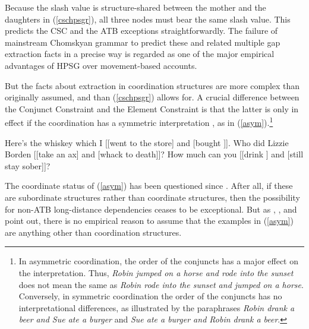 \documentclass[output=paper
                ,modfonts
                ,nonflat
	        ,collection
	        ,collectionchapter
	        ,collectiontoclongg
 	        ,biblatex
                ,babelshorthands
                ,newtxmath
                ,draftmode
                ,colorlinks, citecolor=brown
]{./langsci/langscibook}
\begin{document}
\noindent
Because   the {\sc slash} value  is structure-shared between the mother and the daughters
in (\ref{cschpsgr}),  all  three nodes must bear the same {\sc slash} value.  This predicts the CSC and the ATB exceptions  straightforwardly. The failure of mainstream Chomskyan  grammar to predict these and related multiple  gap extraction facts in a precise way is regarded as one of the  major empirical advantages of HPSG  over movement-based accounts.

But the facts about extraction in coordination structures are more complex than originally assumed, and than (\ref{cschpsgr}) allows for. A crucial  difference between the Conjunct Constraint and the Element Constraint is  that the latter is only in effect if the coordination has a symmetric interpretation  \citep{Ross67,goldsmith,lakoff86,levinprince86}, as in  (\ref{asym}).\footnote{In asymmetric coordination, the order of the conjuncts has a major effect on the interpretation.
  Thus, \emph{Robin jumped on a horse and rode into the sunset} does not 
mean the same as  \emph{Robin rode into the sunset and jumped on a horse}. Conversely,
in symmetric coordination the order of the conjuncts has no interpretational  differences,
as illustrated by the paraphrases \emph{Robin drank a beer and Sue ate a burger}
and \emph{Sue ate a burger and Robin drank a beer}.}


\eal  \label{asym}
\ex
 Here's the whiskey  which I [[went to the store] and [bought \spc]].
\ex Who did Lizzie Borden [[take an ax] and [whack \spcs to death]]?
\ex How much can you [[drink \spc] and [still stay sober]]?
\zl


\noindent
The coordinate status of (\ref{asym}) has been questioned since \cite{Ross67}. After all, if these are subordinate structures rather than coordinate structures, then the possibility for non-ATB long-distance dependencies ceases to be exceptional. But as 
\citet{schmerling72},  \citet{lakoff86}, \citet{levinepostal} and \citet{kehler}  point out,  there is no empirical reason to assume that the examples in (\ref{asym}) are anything other than coordination structures. 
\end{document}
